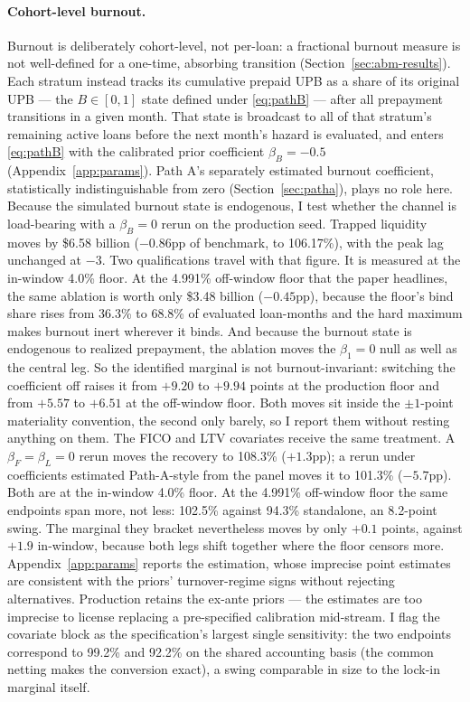 \documentclass[12pt]{article}
\begin{document}
\paragraph{Cohort-level burnout.}
Burnout is deliberately cohort-level, not per-loan: a fractional burnout measure is not well-defined for a one-time, absorbing transition (Section~\ref{sec:abm-results}). Each stratum instead tracks its cumulative prepaid UPB as a share of its original UPB --- the $B \in [0,1]$ state defined under \eqref{eq:pathB} --- after all prepayment transitions in a given month. That state is broadcast to all of that stratum's remaining active loans before the next month's hazard is evaluated, and enters \eqref{eq:pathB} with the calibrated prior coefficient $\beta_B = -0.5$ (Appendix~\ref{app:params}). Path A's separately estimated burnout coefficient, statistically indistinguishable from zero (Section~\ref{sec:patha}), plays no role here. Because the simulated burnout state is endogenous, I test whether the channel is load-bearing with a $\beta_B = 0$ rerun on the production seed. Trapped liquidity moves by \$6.58 billion ($-0.86$pp of benchmark, to 106.17\%), with the peak lag unchanged at $-3$. Two qualifications travel with that figure. It is measured at the in-window 4.0\% floor. At the 4.991\% off-window floor that the paper headlines, the same ablation is worth only \$3.48 billion ($-0.45$pp), because the floor's bind share rises from 36.3\% to 68.8\% of evaluated loan-months and the hard maximum makes burnout inert wherever it binds. And because the burnout state is endogenous to realized prepayment, the ablation moves the $\beta_1 = 0$ null as well as the central leg. So the identified marginal is not burnout-invariant: switching the coefficient off raises it from $+9.20$ to $+9.94$ points at the production floor and from $+5.57$ to $+6.51$ at the off-window floor. Both moves sit inside the $\pm 1$-point materiality convention, the second only barely, so I report them without resting anything on them. The FICO and LTV covariates receive the same treatment. A $\beta_F = \beta_L = 0$ rerun moves the recovery to 108.3\% ($+1.3$pp); a rerun under coefficients estimated Path-A-style from the panel moves it to 101.3\% ($-5.7$pp). Both are at the in-window 4.0\% floor. At the 4.991\% off-window floor the same endpoints span more, not less: 102.5\% against 94.3\% standalone, an 8.2-point swing. The marginal they bracket nevertheless moves by only $+0.1$ points, against $+1.9$ in-window, because both legs shift together where the floor censors more. Appendix~\ref{app:params} reports the estimation, whose imprecise point estimates are consistent with the priors' turnover-regime signs without rejecting alternatives. Production retains the ex-ante priors --- the estimates are too imprecise to license replacing a pre-specified calibration mid-stream. I flag the covariate block as the specification's largest single sensitivity: the two endpoints correspond to 99.2\% and 92.2\% on the shared accounting basis (the common netting makes the conversion exact), a swing comparable in size to the lock-in marginal itself.
\end{document}
